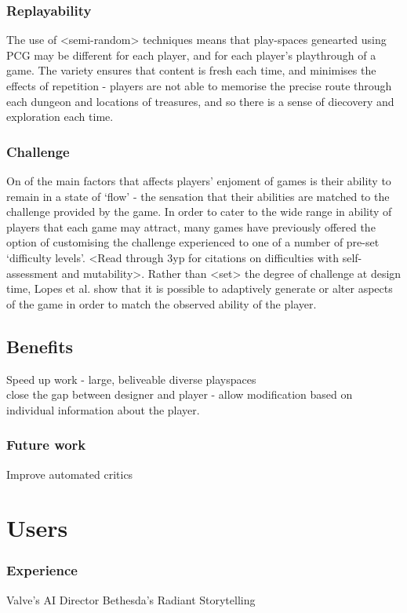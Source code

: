 \documentclass{acm_proc_article-sp}
\begin{document}
\subsubsection{Replayability}
The use of <semi-random> techniques means that play-spaces genearted using PCG may be different for each player, and for each player's playthrough of a game. The variety ensures that content is fresh each time, and minimises the effects of repetition - players are not able to memorise the precise route through each dungeon and locations of treasures, and so there is a sense of diecovery and exploration each time.

\subsubsection{Challenge}
On of the main factors that affects players' enjoment of games is their ability to remain in a state of `flow' - the sensation that their abilities are matched to the challenge provided by the game\cite{flow}.
In order to cater to the wide range in ability of players that each game may attract, many games have previously offered the option of customising the challenge experienced to one of a number of pre-set `difficulty levels'. <Read through 3yp for citations on difficulties with self-assessment and mutability>. Rather than <set> the degree of challenge at design time, Lopes et al. show that it is possible to adaptively generate or alter aspects of the game\cite{lopes2011adaptivity} in order to match the observed ability of the player\cite{ResE5}.

\subsection{Benefits}
Speed up work - large, beliveable diverse playspaces\\
close the gap between designer and player - allow modification based on individual information about the player.
\subsubsection{Future work}
Improve automated critics \cite{hendrikx2012procedural}

\section{Users}

\subsubsection{Experience}
Valve's AI Director
Bethesda's Radiant Storytelling
\end{document}
